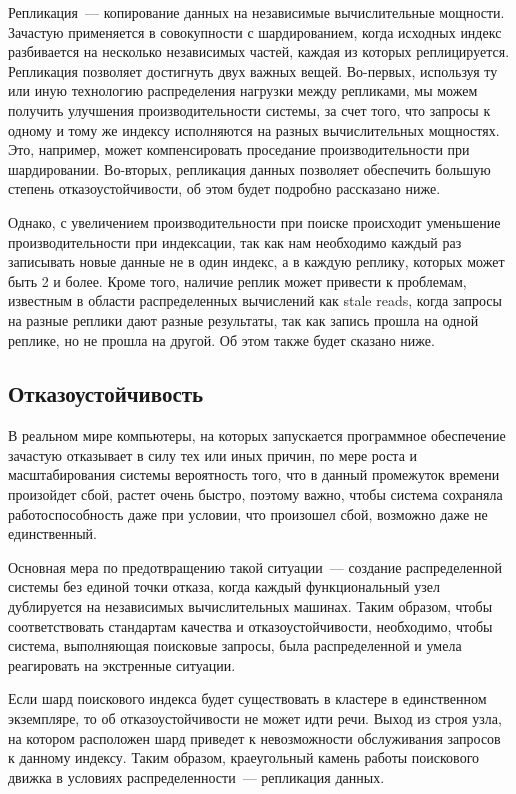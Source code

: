 Репликация~--- копирование данных на независимые вычислительные мощности. Зачастую применяется в совокупности с шардированием, когда исходных индекс разбивается на несколько независимых частей, каждая из которых реплицируется. Репликация позволяет достигнуть двух важных вещей. Во-первых, используя ту или иную технологию распределения нагрузки между репликами, мы можем получить улучшения производительности системы, за счет того, что запросы к одному и тому же индексу исполняются на разных вычислительных мощностях. Это, например, может компенсировать проседание производительности при шардировании. Во-вторых, репликация данных позволяет обеспечить большую степень отказоустойчивости, об этом будет подробно рассказано ниже.

Однако, с увеличением производительности при поиске происходит уменьшение производительности при индексации, так как нам необходимо каждый раз записывать новые данные не в один индекс, а в каждую реплику, которых может быть 2 и более. Кроме того, наличие реплик может привести к проблемам, известным в области распределенных вычислений как stale reads, когда запросы на разные реплики дают разные результаты, так как запись прошла на одной реплике, но не прошла на другой. Об этом также будет сказано ниже.

\subsection{Отказоустойчивость}

В реальном мире компьютеры, на которых запускается программное обеспечение зачастую отказывает в силу тех или иных причин, по мере роста и масштабирования системы вероятность того, что в данный промежуток времени произойдет сбой, растет очень быстро, поэтому важно, чтобы система сохраняла работоспособность даже при условии, что произошел сбой, возможно даже не единственный.

Основная мера по предотвращению такой ситуации~--- создание распределенной системы без единой точки отказа, когда каждый функциональный узел дублируется на независимых вычислительных машинах. Таким образом, чтобы соответствовать стандартам качества и отказоустойчивости, необходимо, чтобы система, выполняющая поисковые запросы, была распределенной и умела реагировать на экстренные ситуации.

Если шард поискового индекса будет существовать в кластере в единственном экземпляре, то об отказоустойчивости не может идти речи. Выход из строя узла, на котором расположен шард приведет к невозможности обслуживания запросов к данному индексу. Таким образом, краеугольный камень работы поискового движка в условиях распределенности~--- репликация данных.

